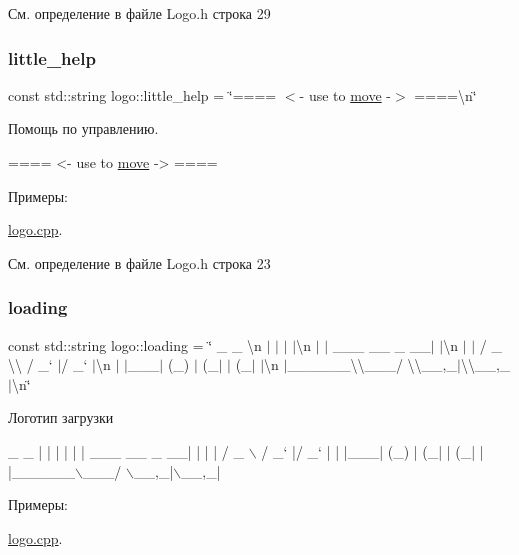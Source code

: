 См. определение в файле Logo.\+h строка 29

\mbox{\label{namespacelogo_adf18ab31906b644891fc8311df747a9d}} 
\subsubsection{\texorpdfstring{little\+\_\+help}{little\_help}}
{\footnotesize\ttfamily const std\+::string logo\+::little\+\_\+help = \char`\"{}==== $<$-\/ use to \hyperlink{namespacelogo_a03b6b80b5648e7dbbbf00b258df733b6}{move} -\/$>$ ====\textbackslash{}n\char`\"{}}

Помощь по управлению. 
\begin{DoxyCode}
==== <- use to \hyperlink{namespacelogo_a03b6b80b5648e7dbbbf00b258df733b6}{move} -> ====
\end{DoxyCode}
 \begin{Desc}
\item[Примеры\+: ]\par
\hyperlink{logo_8cpp-example}{logo.\+cpp}.\end{Desc}


См. определение в файле Logo.\+h строка 23

\mbox{\label{namespacelogo_ad29ac81055f7eb3624a283f55af8d5ad}} 
\subsubsection{\texorpdfstring{loading}{loading}}
{\footnotesize\ttfamily const std\+::string logo\+::loading = \char`\"{} \+\_\+ \+\_\+ \textbackslash{}n $\vert$ $\vert$ $\vert$ $\vert$\textbackslash{}n $\vert$ $\vert$ \+\_\+\+\_\+\+\_\+ \+\_\+\+\_\+ \+\_\+ \+\_\+\+\_\+$\vert$ $\vert$\textbackslash{}n $\vert$ $\vert$ / \+\_\+ \textbackslash{}\textbackslash{} / \+\_\+` $\vert$/ \+\_\+` $\vert$\textbackslash{}n $\vert$ $\vert$\+\_\+\+\_\+\+\_\+$\vert$ (\+\_\+) $\vert$ (\+\_\+$\vert$ $\vert$ (\+\_\+$\vert$ $\vert$\textbackslash{}n $\vert$\+\_\+\+\_\+\+\_\+\+\_\+\+\_\+\+\_\+\textbackslash{}\textbackslash{}\+\_\+\+\_\+\+\_\+/ \textbackslash{}\textbackslash{}\+\_\+\+\_\+,\+\_\+$\vert$\textbackslash{}\textbackslash{}\+\_\+\+\_\+,\+\_\+$\vert$\textbackslash{}n\char`\"{}}

Логотип загрузки 
\begin{DoxyCode}
 \_                     \_ 
| |                   | |
| |     \_\_\_   \_\_ \_  \_\_| |
| |    / \_ \(\backslash\) / \_` |/ \_` |
| |\_\_\_| (\_) | (\_| | (\_| |
|\_\_\_\_\_\_\(\backslash\)\_\_\_/ \(\backslash\)\_\_,\_|\(\backslash\)\_\_,\_|  
\end{DoxyCode}
 \begin{Desc}
\item[Примеры\+: ]\par
\hyperlink{logo_8cpp-example}{logo.\+cpp}.\end{Desc}


